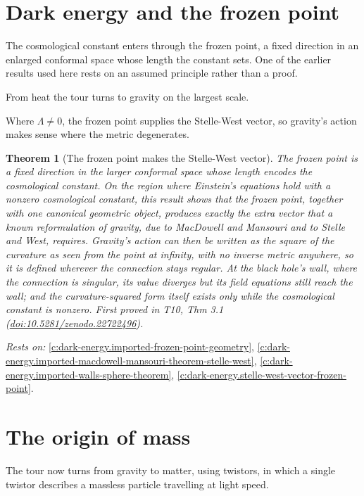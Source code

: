 \documentclass[11pt]{article}
\newtheorem{theorem}{Theorem}[section]
\theoremstyle{definition}
\theoremstyle{plain}
\begin{document}
\section{Dark energy and the frozen point}

The cosmological constant enters through the frozen point, a fixed direction in an enlarged conformal space whose length the constant sets. One of the earlier results used here rests on an assumed principle rather than a proof.

From heat the tour turns to gravity on the largest scale.

Where $\Lambda \neq 0$, the frozen point supplies the Stelle-West vector, so gravity's action makes sense where the metric degenerates.

\begin{theorem}[The frozen point makes the Stelle-West vector]\label{c:dark-energy.frozen-point-makes-stelle-west-vector}
The frozen point is a fixed direction in the larger conformal space whose length encodes the cosmological constant. On the region where Einstein's equations hold with a nonzero cosmological constant, this result shows that the frozen point, together with one canonical geometric object, produces exactly the extra vector that a known reformulation of gravity, due to MacDowell and Mansouri and to Stelle and West, requires. Gravity's action can then be written as the square of the curvature as seen from the point at infinity, with no inverse metric anywhere, so it is defined wherever the connection stays regular. At the black hole's wall, where the connection is singular, its value diverges but its field equations still reach the wall; and the curvature-squared form itself exists only while the cosmological constant is nonzero.
\emph{First proved in} T10, Thm 3.1 (\href{https://doi.org/10.5281/zenodo.22722496}{doi:10.5281/zenodo.22722496}).
\end{theorem}
\noindent\emph{Rests on:} \ref{c:dark-energy.imported-frozen-point-geometry}, \ref{c:dark-energy.imported-macdowell-mansouri-theorem-stelle-west}, \ref{c:dark-energy.imported-walls-sphere-theorem}, \ref{c:dark-energy.stelle-west-vector-frozen-point}.

\section{The origin of mass}

The tour now turns from gravity to matter, using twistors, in which a single twistor describes a massless particle travelling at light speed.
\end{document}
